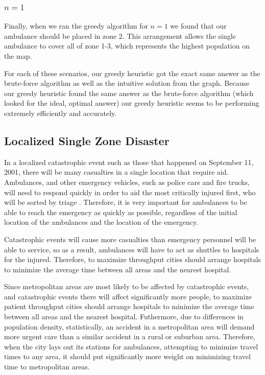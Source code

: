 \documentclass[notitlepage, 12pt]{article}
\begin{document}
\subsubsection{$n=1$}
Finally, when we ran the greedy algorithm for $n=1$ we found that our ambulance should be placed in zone 2. This arrangement allows the single ambulance to cover all of zone 1-3, which represents the highest population on the map.

For each of these scenarios, our greedy heuristic got the exact same answer as the
brute-force algorithm as well as the intuitive solution from the graph. Because our greedy heuristic found the same answer as the brute-force algorithm (which looked for the ideal, optimal answer) our greedy heuristic seems to be performing extremely efficiently and accurately. 

\subsection{Localized Single Zone Disaster}
In a localized catastrophic event such as those that happened on September 11, 2001, there will be
many casualties in a single location that require aid. Ambulances, and other emergency vehicles,
such as police cars and fire trucks, will need to respond quickly in order to aid the most critically
injured first, who will be sorted by triage \cite{ColRev}. Therefore, it is very important for ambulances to be able to
reach the emergency as quickly as possible, regardless of the initial location of the ambulances and the
location of the emergency.

Catastrophic events will cause more casualties than emergency personnel will be able to service, so as a result,
ambulances will have to act as shuttles to hospitals for the injured. Therefore, to maximize throughput
cities should arrange hospitals to minimize the average time between all areas and the nearest
hospital.

Since metropolitan areas are most likely to be affected by catastrophic events, and catastrophic events there
will affect significantly more people, to maximize patient throughput cities should arrange hospitals to minimize
the average time between all areas and the nearest hospital. Futhermore, due to differences in population density,
statistically, an accident in a metropolitan area will demand more urgent care than a similar accident
in a rural or suburban area. Therefore, when the city lays out its stations for ambulances, attempting to minimize
travel times to any area, it should put significantly more weight on minimizing travel time to metropolitan areas.
\end{document}
